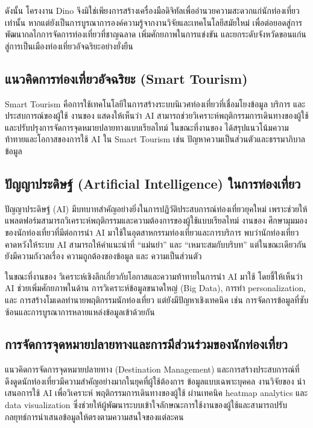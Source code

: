 ดังนั้น โครงงาน Dino จึงมิใช่เพียงการสร้างเครื่องมือดิจิทัลเพื่ออำนวยความสะดวกแก่นักท่องเที่ยวเท่านั้น หากแต่ยังเป็นการบูรณาการองค์ความรู้จากงานวิจัยและเทคโนโลยีสมัยใหม่ เพื่อต่อยอดสู่การพัฒนากลไกการจัดการท่องเที่ยวที่ชาญฉลาด เพิ่มศักยภาพในการแข่งขัน และยกระดับจังหวัดขอนแก่นสู่การเป็นเมืองท่องเที่ยวอัจฉริยะอย่างยั่งยืน

\subsection{แนวคิดการท่องเที่ยวอัจฉริยะ (Smart Tourism)}

Smart Tourism คือการใช้เทคโนโลยีในการสร้างระบบนิเวศท่องเที่ยวที่เชื่อมโยงข้อมูล บริการ และประสบการณ์ของผู้ใช้ งานของ \textcite{ma2025} แสดงให้เห็นว่า AI สามารถช่วยวิเคราะห์พฤติกรรมการเดินทางของผู้ใช้และปรับปรุงการจัดการจุดหมายปลายทางแบบเรียลไทม์ ในขณะที่งานของ \textcite{milton2023} ได้สรุปแนวโน้มความท้าทายและโอกาสของการใช้ AI ใน Smart Tourism เช่น ปัญหาความเป็นส่วนตัวและธรรมาภิบาลข้อมูล

\subsection{ปัญญาประดิษฐ์ (Artificial Intelligence) ในการท่องเที่ยว}

ปัญญาประดิษฐ์ (AI) มีบทบาทสำคัญอย่างยิ่งในการปฏิวัติประสบการณ์ท่องเที่ยวยุคใหม่ เพราะช่วยให้แพลตฟอร์มสามารถวิเคราะห์พฤติกรรมและความต้องการของผู้ใช้แบบเรียลไทม์ งานของ \textcite{sousa2024} ศึกษามุมมองของนักท่องเที่ยวที่มีต่อการนำ AI มาใช้ในอุตสาหกรรมท่องเที่ยวและการบริการ พบว่านักท่องเที่ยวคาดหวังให้ระบบ AI สามารถให้คำแนะนำที่ ``แม่นยำ'' และ ``เหมาะสมกับบริบท'' แต่ในขณะเดียวกันยังมีความกังวลเรื่อง ความถูกต้องของข้อมูล และ ความเป็นส่วนตัว

ในขณะที่งานของ \textcite{milton2023} วิเคราะห์เชิงลึกเกี่ยวกับโอกาสและความท้าทายในการนำ AI มาใช้ โดยชี้ให้เห็นว่า AI ช่วยเพิ่มศักยภาพในด้าน การวิเคราะห์ข้อมูลขนาดใหญ่ (Big Data), การทำ personalization, และ การสร้างโมเดลทำนายพฤติกรรมนักท่องเที่ยว แต่ยังมีปัญหาเชิงเทคนิค เช่น การจัดการข้อมูลที่ซับซ้อนและการบูรณาการหลายแหล่งข้อมูลเข้าด้วยกัน

\subsection{การจัดการจุดหมายปลายทางและการมีส่วนร่วมของนักท่องเที่ยว}

แนวคิดการจัดการจุดหมายปลายทาง (Destination Management) และการสร้างประสบการณ์ที่ดึงดูดนักท่องเที่ยวมีความสำคัญอย่างมากในยุคที่ผู้ใช้ต้องการ ข้อมูลแบบเฉพาะบุคคล งานวิจัยของ \textcite{ma2025} นำเสนอการใช้ AI เพื่อวิเคราะห์ พฤติกรรมการเดินทางของผู้ใช้ ผ่านเทคนิค heatmap analytics และ data visualization ซึ่งช่วยให้ผู้พัฒนาระบบเข้าใจลักษณะการใช้งานของผู้ใช้และสามารถปรับกลยุทธ์การนำเสนอข้อมูลให้ตรงตามความสนใจของแต่ละคน

